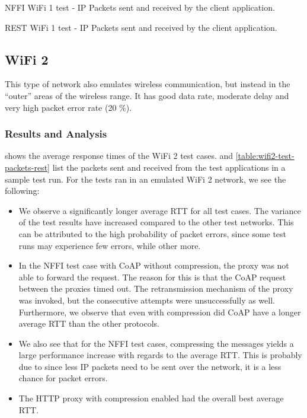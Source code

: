 \begin{table}[h]

\caption{NFFI WiFi 1 test - IP Packets sent and received by the client application.}
\label{table:wifi1-test-packets-nffi}
\end{table}

\begin{table}[h]

\caption{REST WiFi 1 test - IP Packets sent and received by the client application.}
\label{table:wifi1-test-packets-rest}
\end{table}


\subsection{WiFi 2}

This type of network also emulates wireless communication, but instead in the
``outer'' areas of the wireless range. It has good data rate, moderate delay
and very high packet error rate (20 \%).


\subsubsection{Results and Analysis}

 shows the average response times of the WiFi 2 test
cases.  and
\cref{table:wifi2-test-packets-rest} list the packets sent and received from the
test applications in a sample test run. For the tests ran in an emulated WiFi 2
network, we see the following:

\begin{itemize}

    \item We observe a significantly longer average RTT for all test cases. The
    variance of the test results have increased compared to the other test
    networks. This can be attributed to the high probability of packet errors,
    since some test runs may experience few errors, while other more.

    \item In the NFFI test case with CoAP without compression, the proxy was not
    able to forward the request. The reason for this is that the CoAP request
    between the proxies timed out. The retransmission mechanism of the proxy
    was invoked, but the consecutive attempts were unsuccessfully as well.
    Furthermore, we observe that even with compression did CoAP have a longer
    average RTT than the other protocols.

    \item We also see that for the NFFI test cases, compressing the messages
    yields a large performance increase with regards to the average RTT. This is
    probably due to since less IP packets need to be sent over the network, it
    is a less chance for packet errors.

    \item The HTTP proxy with compression enabled had the overall best average
    RTT.

\end{itemize}



